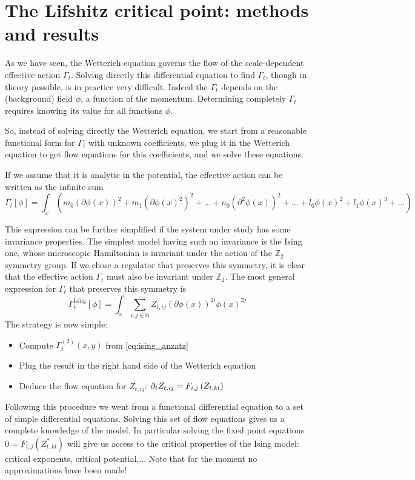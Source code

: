 \chapter{The Lifshitz critical point: methods and results}

As we have seen, the Wetterich equation governs the flow of the scale-dependent effective action $\Gamma_t$. Solving directly this differential equation to find $\Gamma_t$, though in theory possible, is in practice very difficult. Indeed the $\Gamma_t$ depends on the (background) field $\phi$, a function of the momentum. Determining completely $\Gamma_t$ requires knowing its value for all functions $\phi$. 

So, instead of solving directly the Wetterich equation, we start from a reasonable functional form for $\Gamma_t$ with unknown coefficients, we plug it in the Wetterich equation to get flow equations for this coefficients, and we solve these equations.

If we assume that it is analytic in the potential, the effective action can be written as the infinite sum
\begin{equation}
\Gamma_t[\phi] = \int_{x} \left( m_0 (\partial \phi(x))^2 + m_1 (\partial \phi(x)^2)^2 + ... + n_0 (\partial^2 \phi(x))^2 + ... + l_0 \phi(x)^2 + l_1 \phi(x)^3 +... \right)
\end{equation}

This expression can be further simplified if the system under study has some invariance properties. The simplest model having such an invariance is the Ising one, whose microscopic Hamiltonian is invariant under the action of the $\mathds{Z}_2$ symmetry group. If we chose a regulator that preserves this symmetry, it is clear that the effective action $\Gamma_t$ must also be invariant under $\mathds{Z}_2$. The most general expression for $\Gamma_t$ that preserves this symmetry is
\begin{equation}
\label{eq:ising_anzatz}
\Gamma_t^{\text{Ising}}[\phi] = \int_{x} \sum_{i,j \in \mathds{N}} Z_{t,ij} (\partial \phi(x))^{2i} \phi(x)^{2 j}
\end{equation}
The strategy is now simple:
\begin{itemize}
\item Compute $\Gamma_t^{(2)}(x,y)$ from \eqref{eq:ising_anzatz}
\item Plug the result in the right hand side of the Wetterich equation
\item Deduce the flow equation for $Z_{t,ij}$: $\partial_{t} Z_{t,ij} = F_{i,j}\left( {Z_{t,kl}} \right)$
\end{itemize}
Following this procedure we went from a functional differential equation to a set of simple differential equations. Solving this set of flow equations gives us a complete knowledge of the model. In particular solving the fixed point equations $0 = F_{i,j}\left( {Z^*_{t,kl}} \right)$ will give us access to the critical properties of the Ising model: critical exponents, critical potential,... Note that for the moment no approximations have been made!

